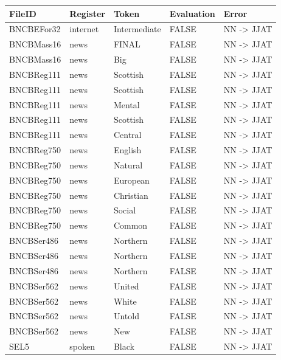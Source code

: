 \documentclass[
  letterpaper,
  DIV=11,
  numbers=noendperiod]{scrreprt}
\begin{document}
\begin{longtable}[]{@{}lllll@{}}
\toprule\noalign{}
FileID & Register & Token & Evaluation & Error \\
\midrule\noalign{}
\endhead
\bottomrule\noalign{}
\endlastfoot
BNCBEFor32 & internet & Intermediate & FALSE & NN -\textgreater{}
JJAT \\
BNCBMass16 & news & FINAL & FALSE & NN -\textgreater{} JJAT \\
BNCBMass16 & news & Big & FALSE & NN -\textgreater{} JJAT \\
BNCBReg111 & news & Scottish & FALSE & NN -\textgreater{} JJAT \\
BNCBReg111 & news & Scottish & FALSE & NN -\textgreater{} JJAT \\
BNCBReg111 & news & Mental & FALSE & NN -\textgreater{} JJAT \\
BNCBReg111 & news & Scottish & FALSE & NN -\textgreater{} JJAT \\
BNCBReg111 & news & Central & FALSE & NN -\textgreater{} JJAT \\
BNCBReg750 & news & English & FALSE & NN -\textgreater{} JJAT \\
BNCBReg750 & news & Natural & FALSE & NN -\textgreater{} JJAT \\
BNCBReg750 & news & European & FALSE & NN -\textgreater{} JJAT \\
BNCBReg750 & news & Christian & FALSE & NN -\textgreater{} JJAT \\
BNCBReg750 & news & Social & FALSE & NN -\textgreater{} JJAT \\
BNCBReg750 & news & Common & FALSE & NN -\textgreater{} JJAT \\
BNCBSer486 & news & Northern & FALSE & NN -\textgreater{} JJAT \\
BNCBSer486 & news & Northern & FALSE & NN -\textgreater{} JJAT \\
BNCBSer486 & news & Northern & FALSE & NN -\textgreater{} JJAT \\
BNCBSer562 & news & United & FALSE & NN -\textgreater{} JJAT \\
BNCBSer562 & news & White & FALSE & NN -\textgreater{} JJAT \\
BNCBSer562 & news & Untold & FALSE & NN -\textgreater{} JJAT \\
BNCBSer562 & news & New & FALSE & NN -\textgreater{} JJAT \\
SEL5 & spoken & Black & FALSE & NN -\textgreater{} JJAT \\
\end{longtable}
\end{document}
